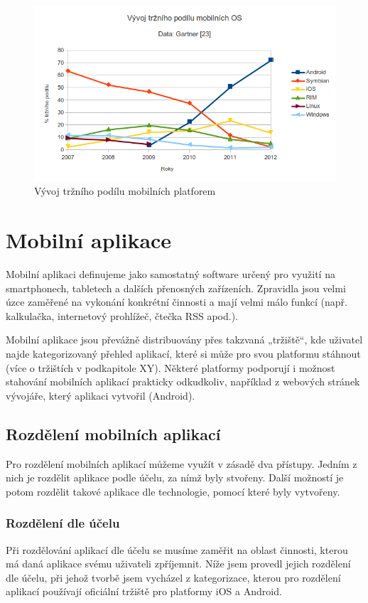 \begin{figure}\centering
\includegraphics[width=1.0\textwidth]{graf_vyvoj_mobilnich_os.png}
\caption{Vývoj tržního podílu mobilních platforem}
\label{fig:MobilniPlatformyVyvoj}
\end{figure}

\section{Mobilní aplikace} \label{Sec:Aplikace}
Mobilní aplikaci definujeme jako samostatný software určený pro využití na smartphonech, tabletech a dalších přenosných zařízeních. Zpravidla jsou velmi úzce zaměřené na vykonání konkrétní činnosti a mají velmi málo funkcí (např. kalkulačka, internetový prohlížeč, čtečka RSS apod.).

Mobilní aplikace jsou převážně distribuovány přes takzvaná „tržiště“, kde uživatel najde kategorizovaný přehled aplikací, které si může pro svou platformu stáhnout (více o tržištích v podkapitole XY). Některé platformy podporují i možnost stahování mobilních aplikací prakticky odkudkoliv, například z webových stránek vývojáře, který aplikaci vytvořil (Android).

\subsection{Rozdělení mobilních aplikací}
Pro rozdělení mobilních aplikací můžeme využít v zásadě dva přístupy. Jedním z nich je rozdělit aplikace podle účelu, za nímž byly stvořeny. Další možností je potom rozdělit takové aplikace dle technologie, pomocí které byly vytvořeny.

\subsubsection{Rozdělení dle účelu}
Při rozdělování aplikací dle účelu se musíme zaměřit na oblast činnosti, kterou má daná aplikace svému uživateli zpříjemnit. Níže jsem provedl jejich rozdělení dle účelu, při jehož tvorbě jsem vycházel z kategorizace, kterou pro rozdělení aplikací používají oficiální tržiště pro platformy iOS a Android.

